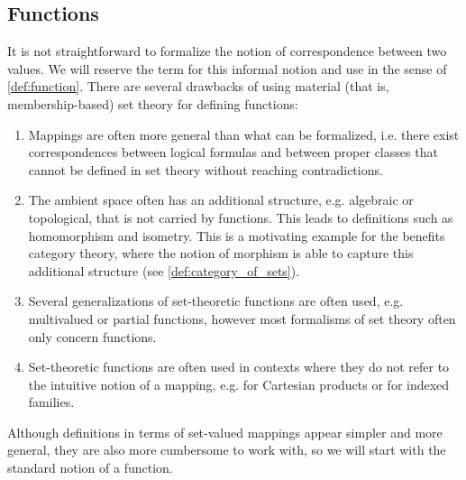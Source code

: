 \subsection{Functions}\label{subsec:functions}

\begin{remark}\label{remark:function_definition}
  It is not straightforward to formalize the notion of correspondence between two values. We will reserve the term  for this informal notion and use  in the sense of \cref{def:function}. There are several drawbacks of using material (that is, membership-based) set theory for defining functions:
  \begin{enumerate}
    \item Mappings are often more general than what can be formalized, i.e. there exist correspondences between logical formulas and between proper classes that cannot be defined in set theory without reaching contradictions.
    \item The ambient space often has an additional structure, e.g. algebraic or topological, that is not carried by functions. This leads to definitions such as homomorphism and isometry. This is a motivating example for the benefits category theory, where the notion of morphism is able to capture this additional structure (see \cref{def:category_of_sets}).
    \item Several generalizations of set-theoretic functions are often used, e.g. multivalued or partial functions, however most formalisms of set theory often only concern functions.
    \item Set-theoretic functions are often used in contexts where they do not refer to the intuitive notion of a mapping, e.g. for Cartesian products or for indexed families.
  \end{enumerate}

  Although definitions in terms of set-valued mappings appear simpler and more general, they are also more cumbersome to work with, so we will start with the standard notion of a function.
\end{remark}

